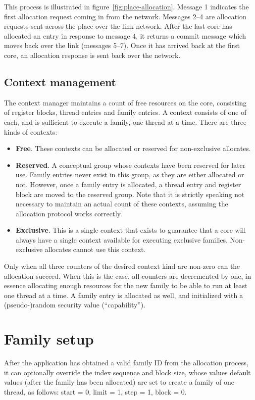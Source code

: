 This process is illustrated in figure~\ref{fig:place-allocation}. Message 1 indicates the first allocation request coming in from the network. Messages 2--4 are allocation requests sent across the place over the link network. After the last core has allocated an entry in response to message 4, it returns a commit message which moves back over the link (messages 5--7). Once it has arrived back at the first core, an allocation response is sent back over the network.

\subsection{Context management}
The context manager maintains a count of free resources on the core, consisting of register blocks, thread entries and family entries. A context consists of one of each, and is sufficient to execute a family, one thread at a time.
There are three kinds of contexts:
\begin{itemize}
\item {\bf Free}. These contexts can be allocated or reserved for non-exclusive allocates.
\item {\bf Reserved}. A conceptual group whose contexts have been reserved for later use. Family entries never exist in this group, as they are either allocated or not. However, once a family entry is allocated, a thread entry and register block are moved to the reserved group. Note that it is strictly speaking not necessary to maintain an actual count of these contexts, assuming the allocation protocol works correctly.
\item {\bf Exclusive}. This is a single context that exists to guarantee that a core will always have a single context available for executing exclusive families. Non-exclusive allocates cannot use this context.
\end{itemize}

Only when all three counters of the desired context kind are non-zero can the allocation succeed. When this is the case, all counters are decremented by one, in essence allocating enough resources for the new family to be able to run at least one thread at a time. A family entry is allocated as well, and initialized with a (pseudo-)random security value (``capability'').

\section{\label{sec:family-setup}Family setup}
After the application has obtained a valid family ID from the allocation process, it can optionally override the index sequence and block size, whose values default values (after the family has been allocated) are set to create a family of one thread, as follows: start = 0, limit = 1, step = 1, block = 0.

